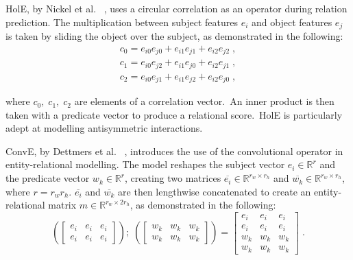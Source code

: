 \noindent HolE, by Nickel et al. \unskip~\citep{nickel2016holographic}, uses a circular correlation as an operator during relation prediction. The multiplication between subject features $ e_i $ and object features $ e_j $ is taken by sliding the object over the subject, as demonstrated in the following:
\begin{subequations}
	\begin{gather}
		c_0 =  e_{i0}e_{j0} + e_{i1}e_{j1} + e_{i2}e_{j2} \; , \\
		c_1 =  e_{i0}e_{j2} + e_{i1}e_{j0} + e_{i2}e_{j1} \; , \\
		c_2 =  e_{i0}e_{j1} + e_{i1}e_{j2} + e_{i2}e_{j0} \; , 
	\end{gather}
\end{subequations}

\noindent where $ c_0, \; c_1, \; c_2 $ are elements of a correlation vector.\ An inner product is then taken with a predicate vector to produce a relational score.\ HolE is particularly adept at modelling antisymmetric interactions. \par

\noindent ConvE, by Dettmers et al. \unskip~\citep{dettmers2018convolutional}, introduces the use of the convolutional operator in entity-relational modelling. The model reshapes the subject vector $ e_i \in \mathbb{R}^{r} $ and the predicate vector $ w_k \in \mathbb{R}^{r} $, creating two matrices $ \overline{e_i} \in \mathbb{R}^{r_w \times r_h} $ and $ \overline{w_k} \in \mathbb{R}^{r_w \times r_h} $, where $ r = r_wr_h $. $ \overline{e_i} $ and $ \overline{w_k} $ are then lengthwise concatenated to create an entity-relational matrix $ m \in \mathbb{R}^{r_w \times 2r_h} $, as demonstrated in the following:
\begin{equation}
	(\begin{bmatrix}
        		e_i & e_i & e_i \\
           	e_i & e_i & e_i 
       	\end{bmatrix}); \; (\begin{bmatrix}
        					w_k & w_k & w_k \\
           	                         w_k & w_k & w_k 
       				\end{bmatrix}) = \begin{bmatrix}
        								e_i & e_i & e_i \\
           	                                                  e_i & e_i & e_i \\
           							w_k & w_k & w_k \\
           	                                                  w_k & w_k & w_k 
        			     				\end{bmatrix} \; .
\end{equation}


